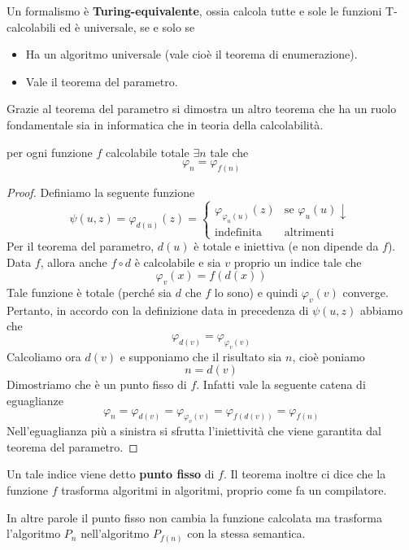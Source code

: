 \begin{theorem}[Espressività]
	Un formalismo è \textbf{Turing-equivalente}, ossia calcola
	tutte e sole le funzioni T-calcolabili ed è universale, se
	e solo se
	\begin{itemize}
		\item Ha un algoritmo universale (vale cioè il teorema
		      di enumerazione).
		\item Vale il teorema del parametro.
	\end{itemize}
\end{theorem}

Grazie al teorema del parametro si dimostra un altro teorema
che ha un ruolo fondamentale sia in informatica che in teoria
della calcolabilità.

\begin{theorem}
	per ogni funzione $f$ calcolabile totale $\exists n$ tale
	che
	\[ \varphi_n = \varphi_{f(n)} \]
	\begin{proof}
		Definiamo la seguente funzione
		\[
			\psi (u, z) = \varphi_{d(u)} (z) =
			\begin{cases}
				\varphi_{\varphi_u (u)} (z) &
				\text{se } \varphi_u (u) \downarrow \\
				\text{indefinita}           &
				\text{altrimenti}
			\end{cases}
		\]
		Per il teorema del parametro, $d(u)$ è totale e
		iniettiva (e non dipende da $f$). Data $f$, allora
		anche $f \circ d$ è calcolabile e sia $v$ proprio
		un indice tale che
		\[ \varphi_v(x) = f(d(x)) \]
		Tale funzione è totale (perché sia $d$ che $f$ lo sono)
		e quindi $\varphi_v (v)$ converge. Pertanto, in accordo
		con la definizione data in precedenza di $\psi (u,z)$
		abbiamo che
		\[ \varphi_{d(v)} = \varphi_{\varphi_v(v)} \]
		Calcoliamo ora $d(v)$ e supponiamo che il risultato sia
		$n$, cioè poniamo
		\[ n = d(v) \]
		Dimostriamo che è un punto fisso di $f$. Infatti vale
		la seguente catena di eguaglianze
		\[
			\varphi_n  = \varphi_{d(v)}
			= \varphi_{\varphi_v (v)}
			= \varphi_{f(d(v))}
			= \varphi_{f(n)}
		\]
		Nell'eguaglianza più a sinistra si sfrutta l'iniettività
		che viene garantita dal teorema del parametro.
	\end{proof}
\end{theorem}

Un tale indice viene detto \textbf{punto fisso} di $f$. Il
teorema inoltre ci dice che la funzione $f$ trasforma algoritmi
in algoritmi, proprio come fa un compilatore.

In altre parole il punto fisso non cambia la funzione calcolata
ma trasforma l'algoritmo $P_n$ nell'algoritmo $P_{f(n)}$ con la
stessa semantica.

